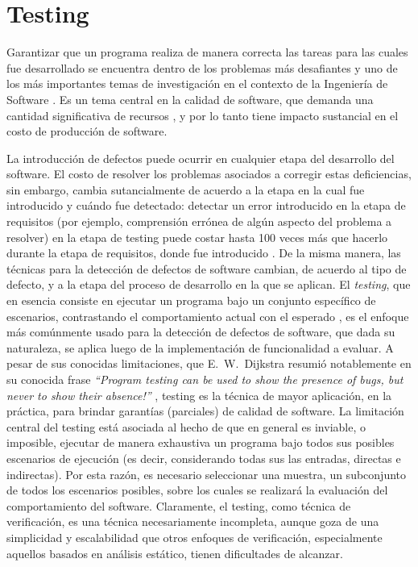 \chapter[Testing]{Testing}
\label{cap:preliminares.testing}

Garantizar que un programa realiza de manera correcta las tareas para las cuales fue desarrollado se encuentra dentro de los problemas m\'as desafiantes y uno de los m\'as importantes temas de investigaci\'on en el contexto de la Ingenier\'ia de Software \cite{bibliography.books.GhezziBook,bibliography.books.PressmanBook,DBLP:series/txcs/Jalote05}. Es un tema central en la calidad de software, que demanda una cantidad significativa de recursos \cite{bibliography.books.JaloteBook}, y por lo tanto tiene impacto sustancial en el costo de producci\'on de software. 

La introducci\'on de defectos puede ocurrir en cualquier etapa del desarrollo del software. El costo de resolver los problemas asociados a corregir estas deficiencias, sin embargo, cambia sutancialmente de acuerdo a la etapa en la cual fue introducido y cu\'ando fue detectado: detectar un error introducido en la etapa de requisitos (por ejemplo, comprensi\'on err\'onea de alg\'un aspecto del problema a resolver) en la etapa de testing puede costar hasta 100 veces m\'as que hacerlo durante la etapa de requisitos, donde fue introducido \cite{bibliography.books.JaloteBook}. De la misma manera, las t\'ecnicas para la detecci\'on de defectos de software cambian, de acuerdo al tipo de defecto, y a la etapa del proceso de desarrollo en la que se aplican. El \emph{testing}, que en esencia consiste en ejecutar un programa bajo un conjunto espec\'ifico de escenarios, contrastando el comportamiento actual con el esperado \cite{bibliography.books.AmmannOffutt}, es el enfoque m\'as com\'unmente usado para la detecci\'on de defectos de software, que dada su naturaleza, se aplica luego de la implementaci\'on de funcionalidad a evaluar. A pesar de sus conocidas limitaciones, que E.~W.~Dijkstra resumi\'o notablemente en su conocida frase \emph{``Program testing can be used to show the presence of bugs, but never to show their absence!''} \cite{Dijkstra:1972:CIN:1243380.1243381}, testing es la t\'ecnica de mayor aplicaci\'on, en la pr\'actica, para brindar garant\'ias (parciales) de calidad de software. La limitaci\'on central del testing est\'a asociada al hecho de que en general es inviable, o imposible, ejecutar de manera exhaustiva un programa bajo todos sus posibles escenarios de ejecuci\'on (es decir, considerando todas sus las entradas, directas e indirectas). Por esta raz\'on, es necesario seleccionar una muestra, un subconjunto de todos los escenarios posibles, sobre los cuales se realizar\'a la evaluaci\'on del comportamiento del software. Claramente, el testing, como t\'ecnica de verificaci\'on, es una t\'ecnica necesariamente incompleta, aunque goza de una simplicidad y escalabilidad que otros enfoques de verificaci\'on, especialmente aquellos basados en an\'alisis est\'atico, tienen dificultades de alcanzar.


